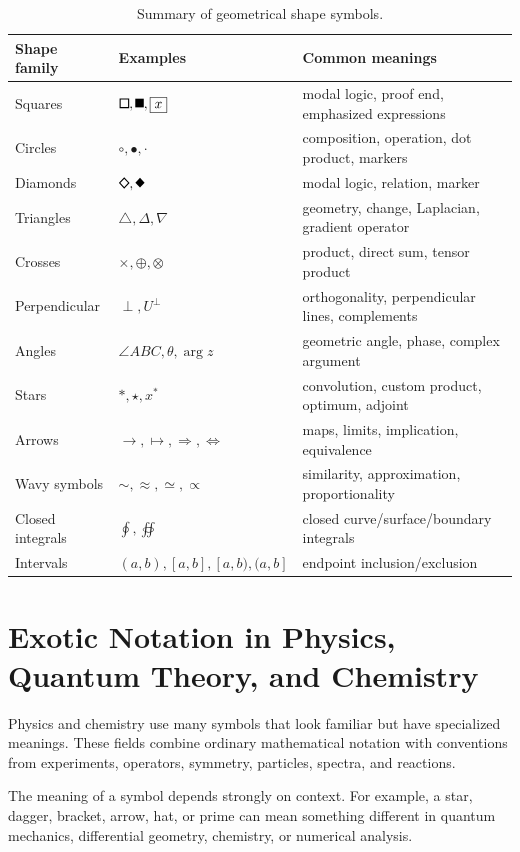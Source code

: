 \documentclass[11pt,twocolumn]{article}
\newcommand{\safesquare}{%
  \mathord{\vcenter{\hbox{\tikz[baseline=-0.5ex]\draw[line width=0.08em] (0,0) rectangle (0.62em,0.62em);}}}%
}
\newcommand{\safeblacksquare}{%
  \mathord{\vcenter{\hbox{\tikz[baseline=-0.5ex]\fill (0,0) rectangle (0.62em,0.62em);}}}%
}
\newcommand{\safediamond}{%
  \mathord{\vcenter{\hbox{\tikz[baseline=-0.5ex]\draw[line width=0.08em] (0.34em,0) -- (0.68em,0.34em) -- (0.34em,0.68em) -- (0,0.34em) -- cycle;}}}%
}
\newcommand{\safeblackdiamond}{%
  \mathord{\vcenter{\hbox{\tikz[baseline=-0.5ex]\fill (0.34em,0) -- (0.68em,0.34em) -- (0.34em,0.68em) -- (0,0.34em) -- cycle;}}}%
}
\newcommand{\safeangle}{\angle}
\begin{document}
\begin{table}[t]
\centering
\small
\caption{Summary of geometrical shape symbols.}
\begin{tabular}{lll}
\toprule
Shape family & Examples & Common meanings \\
\midrule
Squares & $\safesquare,\safeblacksquare,\boxed{x}$ & modal logic, proof end, emphasized expressions \\
Circles & $\circ,\bullet,\cdot$ & composition, operation, dot product, markers \\
Diamonds & $\safediamond,\safeblackdiamond$ & modal logic, relation, marker \\
Triangles & $\triangle,\Delta,\nabla$ & geometry, change, Laplacian, gradient operator \\
Crosses & $\times,\oplus,\otimes$ & product, direct sum, tensor product \\
Perpendicular & $\perp,U^\perp$ & orthogonality, perpendicular lines, complements \\
Angles & $\safeangle ABC,\theta,\arg z$ & geometric angle, phase, complex argument \\
Stars & $\ast,\star,x^*$ & convolution, custom product, optimum, adjoint \\
Arrows & $\to,\mapsto,\Rightarrow,\Leftrightarrow$ & maps, limits, implication, equivalence \\
Wavy symbols & $\sim,\approx,\simeq,\propto$ & similarity, approximation, proportionality \\
Closed integrals & $\oint,\oiint$ & closed curve/surface/boundary integrals \\
Intervals & $(a,b),[a,b],[a,b),(a,b]$ & endpoint inclusion/exclusion \\
\bottomrule
\end{tabular}
\end{table}

\section{Exotic Notation in Physics, Quantum Theory, and Chemistry}

Physics and chemistry use many symbols that look familiar but have specialized
meanings. These fields combine ordinary mathematical notation with conventions
from experiments, operators, symmetry, particles, spectra, and reactions.

The meaning of a symbol depends strongly on context. For example, a star,
dagger, bracket, arrow, hat, or prime can mean something different in quantum
mechanics, differential geometry, chemistry, or numerical analysis.
\end{document}
